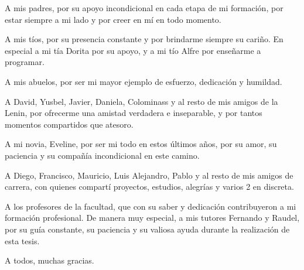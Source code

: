 \begin{acknowledgements}
    A mis padres, por su apoyo incondicional en cada etapa de mi formación, por estar siempre a mi lado y por creer en mí en todo momento.

    A mis tíos, por su presencia constante y por brindarme siempre su cariño. En especial a mi tía Dorita por su apoyo, y a mi tío Alfre por enseñarme a programar.

    A mis abuelos, por ser mi mayor ejemplo de esfuerzo, dedicación y humildad.

    A David, Yusbel, Javier, Daniela, Colominass y al resto de mis amigos de la Lenin, por ofrecerme una amistad verdadera e inseparable, y por tantos momentos compartidos que atesoro.

    A mi novia, Eveline, por ser mi todo en estos últimos años, por su amor, su paciencia y su compañía incondicional en este camino.

    A Diego, Francisco, Mauricio, Luis Alejandro, Pablo y al resto de mis amigos de carrera, con quienes compartí proyectos, estudios, alegrías y varios 2 en discreta.

    A los profesores de la facultad, que con su saber y dedicación contribuyeron a mi formación profesional. De manera muy especial, a mis tutores Fernando y Raudel, por su guía constante, su paciencia y su valiosa ayuda durante la realización de esta tesis.

    A todos, muchas gracias.
\end{acknowledgements}